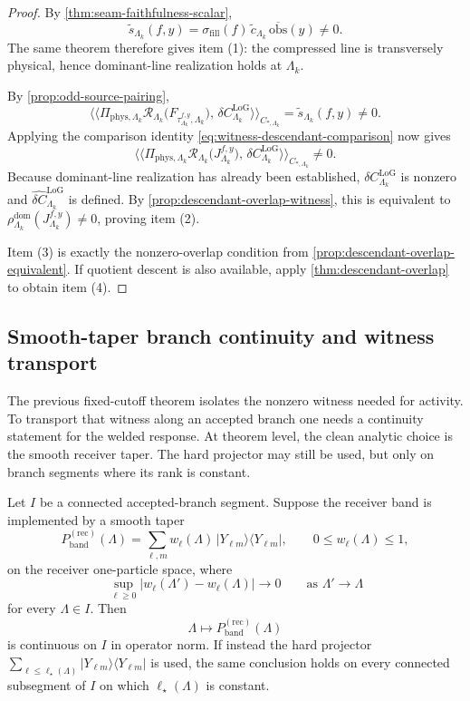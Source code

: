 \documentclass[11pt]{article}
\begin{document}
\begin{proof}
By \cref{thm:seam-faithfulness-scalar},
\[
\widetilde s_{\Lambda_k}(f,y)
=
\sigma_{\mathrm{fill}}(f)\,
\widetilde c_{\Lambda_k}\,
\overline{\mathrm{obs}}(y)
\neq 0.
\]
The same theorem therefore gives item (1): the compressed line is transversely physical, hence
dominant-line realization holds at \(\Lambda_k\).

By \cref{prop:odd-source-pairing},
\[
\big\langle\!\big\langle
\Pi_{\mathrm{phys},\Lambda_k}\mathcal R_{\Lambda_k}\!\big(F_{\tau^{f,y}_{\Lambda_k},\Lambda_k}\big),\,
\delta C^{\mathrm{LoG}}_{\Lambda_k}
\big\rangle\!\big\rangle_{C_{\ast,\Lambda_k}}
=
\widetilde s_{\Lambda_k}(f,y)
\neq 0.
\]
Applying the comparison identity \eqref{eq:witness-descendant-comparison} now gives
\[
\big\langle\!\big\langle
\Pi_{\mathrm{phys},\Lambda_k}\mathcal R_{\Lambda_k}\!\big(J^{f,y}_{\Lambda_k}\big),\,
\delta C^{\mathrm{LoG}}_{\Lambda_k}
\big\rangle\!\big\rangle_{C_{\ast,\Lambda_k}}
\neq 0.
\]
Because dominant-line realization has already been established, \(\delta C^{\mathrm{LoG}}_{\Lambda_k}\)
is nonzero and \(\widehat{\delta C}^{\mathrm{LoG}}_{\Lambda_k}\) is defined.
By \cref{prop:descendant-overlap-witness}, this is equivalent to
\(
\rho^{\mathrm{dom}}_{\Lambda_k}(J^{f,y}_{\Lambda_k})\neq 0
\),
proving item (2).

Item (3) is exactly the nonzero-overlap condition from
\cref{prop:descendant-overlap-equivalent}.
If quotient descent is also available, apply \cref{thm:descendant-overlap} to obtain item (4).
\end{proof}

\subsection*{Smooth-taper branch continuity and witness transport}
\label{subsec:smooth-taper-branch-continuity}

The previous fixed-cutoff theorem isolates the nonzero witness needed for activity.
To transport that witness along an accepted branch one needs a continuity statement for the welded
response.
At theorem level, the clean analytic choice is the smooth receiver taper.
The hard projector may still be used, but only on branch segments where its rank is constant.

\begin{lemma}
\label{lem:smooth-taper-projector}
Let \(I\) be a connected accepted-branch segment.
Suppose the receiver band is implemented by a smooth taper
\[
P^{\mathrm{(rec)}}_{\mathrm{band}}(\Lambda)
=
\sum_{\ell,m} w_\ell(\Lambda)\,|Y_{\ell m}\rangle\langle Y_{\ell m}|,
\qquad
0\le w_\ell(\Lambda)\le 1,
\]
on the receiver one-particle space, where
\[
\sup_{\ell\ge 0}|w_\ell(\Lambda')-w_\ell(\Lambda)|
\longrightarrow 0
\qquad
\text{as }\Lambda'\to\Lambda
\]
for every \(\Lambda\in I\).
Then
\[
\Lambda\longmapsto P^{\mathrm{(rec)}}_{\mathrm{band}}(\Lambda)
\]
is continuous on \(I\) in operator norm.
If instead the hard projector
\(
\sum_{\ell\le \ell_\star(\Lambda)}|Y_{\ell m}\rangle\langle Y_{\ell m}|
\)
is used, the same conclusion holds on every connected subsegment of \(I\) on which
\(\ell_\star(\Lambda)\) is constant.
\end{lemma}
\end{document}

